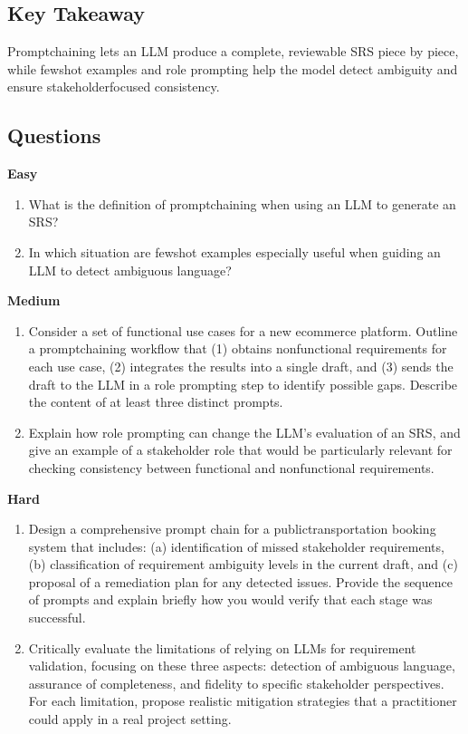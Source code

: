 \documentclass[12pt, a4paper]{article}
\begin{document}
\subsection{Key Takeaway}
Promptchaining lets an LLM produce a complete, reviewable SRS piece by piece, while fewshot examples and role prompting help the model detect ambiguity and ensure stakeholderfocused consistency.

\subsection*{Questions}
\textbf{Easy}
\begin{enumerate}
  \item What is the definition of promptchaining when using an LLM to generate an SRS? \newpage

  \item In which situation are fewshot examples especially useful when guiding an LLM to detect ambiguous language? \newpage
\end{enumerate}

\textbf{Medium}
\begin{enumerate}
  \item Consider a set of functional use cases for a new ecommerce platform. Outline a promptchaining workflow that (1) obtains nonfunctional requirements for each use case, (2) integrates the results into a single draft, and (3) sends the draft to the LLM in a role prompting step to identify possible gaps. Describe the content of at least three distinct prompts. \newpage

  \item Explain how role prompting can change the LLM's evaluation of an SRS, and give an example of a stakeholder role that would be particularly relevant for checking consistency between functional and nonfunctional requirements. \newpage
\end{enumerate}

\textbf{Hard}
\begin{enumerate}
  \item Design a comprehensive prompt chain for a publictransportation booking system that includes: (a) identification of missed stakeholder requirements, (b) classification of requirement ambiguity levels in the current draft, and (c) proposal of a remediation plan for any detected issues. Provide the sequence of prompts and explain briefly how you would verify that each stage was successful. \newpage

  \item Critically evaluate the limitations of relying on LLMs for requirement validation, focusing on these three aspects: detection of ambiguous language, assurance of completeness, and fidelity to specific stakeholder perspectives. For each limitation, propose realistic mitigation strategies that a practitioner could apply in a real project setting. \newpage
\end{enumerate}

\newpage
\end{document}
